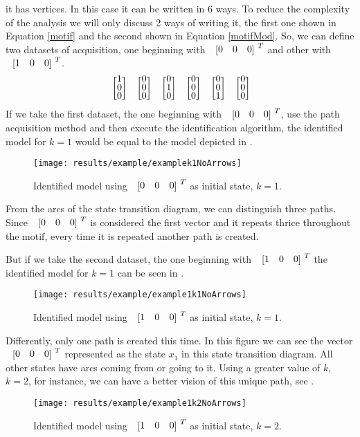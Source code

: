 it has vertices. In this case it can be written in 6 ways. To reduce the
complexity of the analysis we will only discuss 2 ways of writing it, the first
one shown in Equation
\ref{motif} and the second shown in Equation \ref{motifMod}. So, we can define two datasets of acquisition,
one beginning with $\colvec{0&0&0}^T$ and other with $\colvec{1&0&0}^T$.
\begin{align}
  \label{motifMod}
\colvec{1\\0\\0}\colvec{0\\0\\0}\colvec{0\\1\\0}\colvec{0\\0\\0}\colvec{0\\0\\1}\colvec{0\\0\\0}
\end{align}
If we take the first dataset, the one beginning with $\colvec{0&0&0}^T$, use the
path acquisition method and then
execute the identification algorithm, the identified model for $k=1$ would be
equal to the model depicted in . 
\begin{figure}[H]
  \centering
 \texttt{[image: results/example/examplek1NoArrows]}
  \caption{Identified model using $\colvec{0&0&0}^T$ as initial state, $k=1$.}
    \label{fig:exampleCol000k1}
\end{figure}
From the arcs of the state transition diagram, we can distinguish three paths. Since
$\colvec{0&0&0}^T$ is considered the first vector and it repeats thrice
throughout the motif, every time it is repeated another path is created.

But if we take the second dataset, the one beginning with $\colvec{1&0&0}^T$ the identified model for $k=1$ can be
seen in . 
\begin{figure}[H]
  \centering
  \texttt{[image: results/example/example1k1NoArrows]}
  \caption{Identified model using $\colvec{1&0&0}^T$ as initial state, $k=1$.}
    \label{fig:exampleCol100k1}
\end{figure}
Differently, only one path is created this time. In this figure we can see the vector $\colvec{0&0&0}^T$ represented as the state
$x_1$ in this state transition diagram. All other states have arcs coming
from or going to it. Using a greater value of $k$, $k=2$, for instance, we can have a
better vision of this unique path, see .
\begin{figure}[H]
  \centering
  \texttt{[image: results/example/example1k2NoArrows]}
  \caption{Identified model using $\colvec{1&0&0}^T$ as initial state, $k=2$.}
    \label{fig:exampleCol100k2}
  \end{figure}

